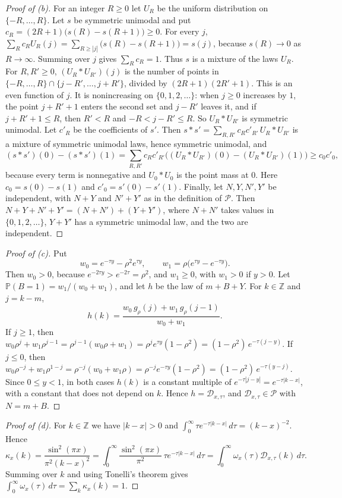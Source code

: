 \documentclass[11pt]{amsart}
\theoremstyle{remark}
\numberwithin{equation}{section}
\renewcommand{\P}{\mathbb{P}}
\begin{document}
\begin{proof}[Proof of (b)]
For an integer $R\ge0$ let $U_R$ be the uniform distribution on $\{-R,\dots,R\}$. Let $s$ be symmetric unimodal and put $c_R=(2R+1)\bigl(s(R)-s(R+1)\bigr)\ge0$. For every $j$, $\sum_Rc_RU_R(j)=\sum_{R\ge|j|}\bigl(s(R)-s(R+1)\bigr)=s(j)$, because $s(R)\to0$ as $R\to\infty$. Summing over $j$ gives $\sum_Rc_R=1$. Thus $s$ is a mixture of the laws $U_R$. For $R,R'\ge0$, $(U_R*U_{R'})(j)$ is the number of points in $\{-R,\dots,R\}\cap\{j-R',\dots,j+R'\}$, divided by $(2R+1)(2R'+1)$. This is an even function of $j$. It is nonincreasing on $\{0,1,2,\dots\}$: when $j\ge0$ increases by $1$, the point $j+R'+1$ enters the second set and $j-R'$ leaves it, and if $j+R'+1\le R$, then $R'<R$ and $-R<j-R'\le R$. So $U_R*U_{R'}$ is symmetric unimodal. Let $c'_R$ be the coefficients of $s'$. Then $s*s'=\sum_{R,R'}c_Rc'_{R'}\,U_R*U_{R'}$ is a mixture of symmetric unimodal laws, hence symmetric unimodal, and
\[
(s*s')(0)-(s*s')(1)=\sum_{R,R'}c_Rc'_{R'}\bigl((U_R*U_{R'})(0)-(U_R*U_{R'})(1)\bigr)\ge c_0c'_0,
\]
because every term is nonnegative and $U_0*U_0$ is the point mass at $0$. Here $c_0=s(0)-s(1)$ and $c'_0=s'(0)-s'(1)$. Finally, let $N,Y,N',Y'$ be independent, with $N+Y$ and $N'+Y'$ as in the definition of $\mathcal P$. Then $N+Y+N'+Y'=(N+N')+(Y+Y')$, where $N+N'$ takes values in $\{0,1,2,\dots\}$, $Y+Y'$ has a symmetric unimodal law, and the two are independent.
\end{proof}

\begin{proof}[Proof of (c)]
Put
\[
w_0=e^{-\tau y}-\rho^2e^{\tau y},\qquad w_1=\rho\bigl(e^{\tau y}-e^{-\tau y}\bigr).
\]
Then $w_0>0$, because $e^{-2\tau y}>e^{-2\tau}=\rho^2$, and $w_1\ge0$, with $w_1>0$ if $y>0$. Let $\P(B=1)=w_1/(w_0+w_1)$, and let $h$ be the law of $m+B+Y$. For $k\in\mathbb Z$ and $j=k-m$,
\[
h(k)=\frac{w_0\,g_\rho(j)+w_1\,g_\rho(j-1)}{w_0+w_1}.
\]
If $j\ge1$, then $w_0\rho^j+w_1\rho^{j-1}=\rho^{j-1}(w_0\rho+w_1)=\rho^je^{\tau y}(1-\rho^2)=(1-\rho^2)\,e^{-\tau(j-y)}$. If $j\le0$, then $w_0\rho^{-j}+w_1\rho^{1-j}=\rho^{-j}(w_0+w_1\rho)=\rho^{-j}e^{-\tau y}(1-\rho^2)=(1-\rho^2)\,e^{-\tau(y-j)}$. Since $0\le y<1$, in both cases $h(k)$ is a constant multiple of $e^{-\tau|j-y|}=e^{-\tau|k-x|}$, with a constant that does not depend on $k$. Hence $h=\mathcal D_{x,\tau}$, and $\mathcal D_{x,\tau}\in\mathcal P$ with $N=m+B$.
\end{proof}

\begin{proof}[Proof of (d)]
For $k\in\mathbb Z$ we have $|k-x|>0$ and $\int_0^\infty\tau e^{-\tau|k-x|}\,d\tau=(k-x)^{-2}$. Hence
\[
\kappa_x(k)=\frac{\sin^2(\pi x)}{\pi^2(k-x)^2}=\int_0^\infty\frac{\sin^2(\pi x)}{\pi^2}\,\tau e^{-\tau|k-x|}\,d\tau=\int_0^\infty\omega_x(\tau)\mathcal D_{x,\tau}(k)\,d\tau.
\]
Summing over $k$ and using Tonelli's theorem gives $\int_0^\infty\omega_x(\tau)\,d\tau=\sum_k\kappa_x(k)=1$.
\end{proof}
\end{document}
